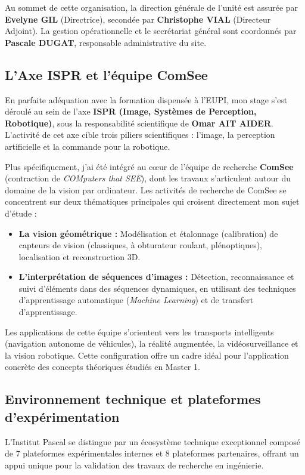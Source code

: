 \documentclass[12pt,a4paper,oneside]{report}
\begin{document}
Au sommet de cette organisation, la direction générale de l'unité est assurée par \textbf{Evelyne GIL} (Directrice), secondée par \textbf{Christophe VIAL} (Directeur Adjoint). La gestion opérationnelle et le secrétariat général sont coordonnés par \textbf{Pascale DUGAT}, responsable administrative du site.

\subsection{L'Axe ISPR et l'équipe ComSee}
En parfaite adéquation avec la formation dispensée à l'EUPI, mon stage s'est déroulé au sein de l'axe \textbf{ISPR (Image, Systèmes de Perception, Robotique)}, sous la responsabilité scientifique de \textbf{Omar AIT AIDER}. L'activité de cet axe cible trois piliers scientifiques : l'image, la perception artificielle et la commande pour la robotique. 

Plus spécifiquement, j'ai été intégré au cœur de l'équipe de recherche \textbf{ComSee} (contraction de \textit{COMputers that SEE}), dont les travaux s'articulent autour du domaine de la vision par ordinateur. Les activités de recherche de ComSee se concentrent sur deux thématiques principales qui croisent directement mon sujet d'étude :
\begin{itemize}
    \item \textbf{La vision géométrique :} Modélisation et étalonnage (calibration) de capteurs de vision (classiques, à obturateur roulant, plénoptiques), localisation et reconstruction 3D.
    \item \textbf{L'interprétation de séquences d'images :} Détection, reconnaissance et suivi d'éléments dans des séquences dynamiques, en utilisant des techniques d'apprentissage automatique (\textit{Machine Learning}) et de transfert d'apprentissage.
\end{itemize}

Les applications de cette équipe s'orientent vers les transports intelligents (navigation autonome de véhicules), la réalité augmentée, la vidéosurveillance et la vision robotique. Cette configuration offre un cadre idéal pour l'application concrète des concepts théoriques étudiés en Master 1.

\subsection{Environnement technique et plateformes d'expérimentation}
L'Institut Pascal se distingue par un écosystème technique exceptionnel composé de 7 plateformes expérimentales internes et 8 plateformes partenaires, offrant un appui unique pour la validation des travaux de recherche en ingénierie.
\end{document}
